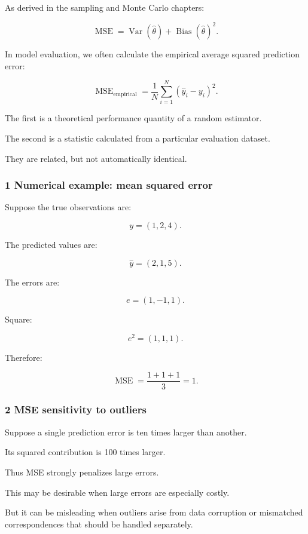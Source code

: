 As derived in the sampling and Monte Carlo chapters:

\[
 \boxed{ \operatorname{MSE} = \operatorname{Var}(\widehat\theta) + \operatorname{Bias}(\widehat\theta)^2 }.
\]

In model evaluation, we often calculate the empirical average squared prediction error:

\[
 \boxed{ \operatorname{MSE}_{\mathrm{empirical}} = \frac1N\sum_{i=1}^{N} (\hat y_i-y_i)^2 }.
\]

The first is a theoretical performance quantity of a random estimator.

The second is a statistic calculated from a particular evaluation dataset.

They are related, but not automatically identical.

\subsubsection{1 Numerical example: mean squared error}\label{02-foundations-ii-ch030-numerical-example-mean-squared-error}

Suppose the true observations are:

\[
 y=(1,2,4).
\]

The predicted values are:

\[
 \hat y=(2,1,5).
\]

The errors are:

\[
 e=(1,-1,1).
\]

Square:

\[
 e^2=(1,1,1).
\]

Therefore:

\[
 \boxed{ \operatorname{MSE}= \frac{1+1+1}{3}=1 }.
\]

\subsubsection{2 MSE sensitivity to outliers}\label{02-foundations-ii-ch030-mse-sensitivity-to-outliers}

Suppose a single prediction error is ten times larger than another.

Its squared contribution is 100 times larger.

Thus MSE strongly penalizes large errors.

This may be desirable when large errors are especially costly.

But it can be misleading when outliers arise from data corruption or mismatched correspondences that should be handled separately.

